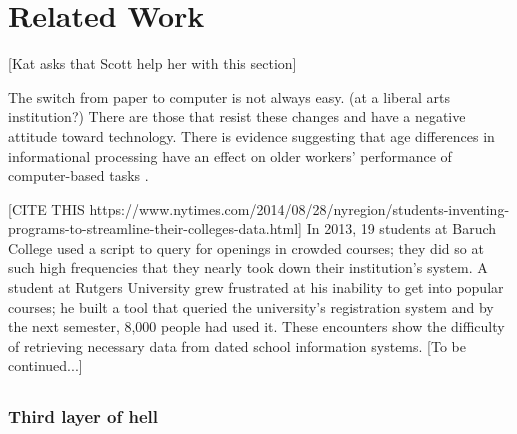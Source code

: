 \section{Related Work}
[Kat asks that Scott help her with this section]

The switch from paper to computer is not always easy. (at a liberal arts institution?) There are those that resist these changes and have a negative attitude toward technology. There is evidence suggesting that age differences in informational processing have an effect on older workers' performance of computer-based tasks \cite{oldpeopleandtech}.




[CITE THIS https://www.nytimes.com/2014/08/28/nyregion/students-inventing-programs-to-streamline-their-colleges-data.html] 
In 2013, 19 students at Baruch College used a script to query for openings in crowded courses; they did so at such high frequencies that they nearly took down their institution's system. A student at Rutgers University grew frustrated at his inability to get into popular courses; he built a tool that queried the university's registration system and by the next semester, 8,000 people had used it. These encounters show the difficulty of retrieving necessary data from dated school information systems. 
[To be continued...]
\subsection{}

\subsubsection{Third layer of hell}

\cite{heggen2018hiring}